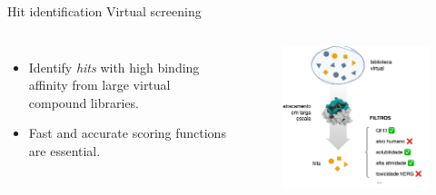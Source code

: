 \documentclass[aspectratio=169,xcolor=dvipsnames]{beamer}
\begin{document}
\begin{frame}{Hit identification \hfill Virtual screening}
    \begin{columns}[c]
        \begin{itemize}
            \item Identify \textit{hits} with high binding affinity from large virtual compound libraries.
            \item \alert{Fast and accurate scoring functions are essential.}
        \end{itemize}

        \begin{figure}
            \centering
            \includegraphics[width=0.95\linewidth]{imgs/virtual-screening.png}
        \end{figure}
    \end{columns}
\end{frame}
\end{document}
